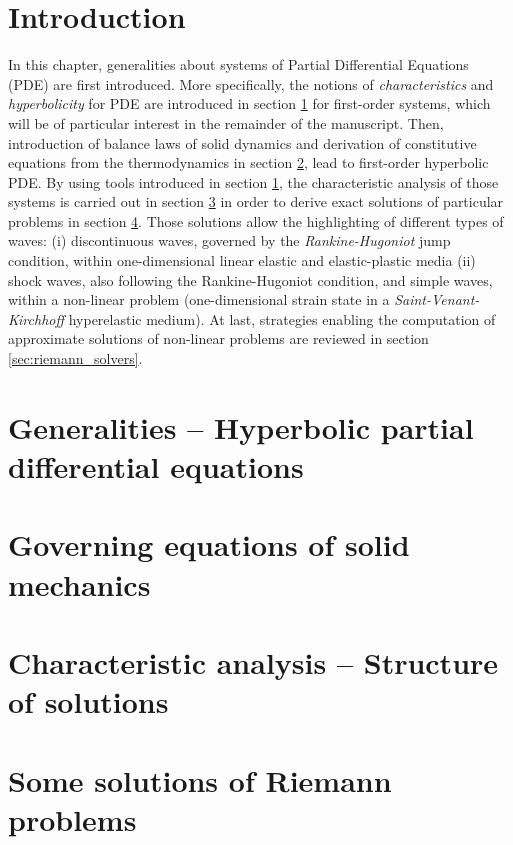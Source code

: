 \section*{Introduction}
In this chapter, generalities about systems of Partial Differential Equations (PDE) are first introduced. More specifically, the notions of \textit{characteristics} and \textit{hyperbolicity} for PDE are introduced in section \ref{sec:PDEs} for first-order systems, which will be of particular interest in the remainder of the manuscript.
Then, introduction of balance laws of solid dynamics and derivation of constitutive equations from the thermodynamics in section \ref{sec:solidMech_equations}, lead to first-order hyperbolic PDE.
By using tools introduced in section \ref{sec:PDEs}, the characteristic analysis of those systems is carried out in section \ref{sec:characteristic_analysis} in order to derive exact solutions of particular problems in section \ref{sec:riemann_problems}. Those solutions allow the highlighting of different types of waves: (i) discontinuous waves, governed by the \textit{Rankine-Hugoniot} jump condition, within one-dimensional linear elastic and elastic-plastic media (ii) shock waves, also following the Rankine-Hugoniot condition, and simple waves, within a non-linear problem (one-dimensional strain state in a \textit{Saint-Venant-Kirchhoff} hyperelastic medium).
At last, strategies enabling the computation of approximate solutions of non-linear problems are reviewed in section \ref{sec:riemann_solvers}.


\section{Generalities -- Hyperbolic partial differential equations}
\label{sec:PDEs}


\section{Governing equations of solid mechanics}
\label{sec:solidMech_equations}



\section{Characteristic analysis -- Structure of solutions}
\label{sec:characteristic_analysis}


\section{Some solutions of Riemann problems}
\label{sec:riemann_problems}

